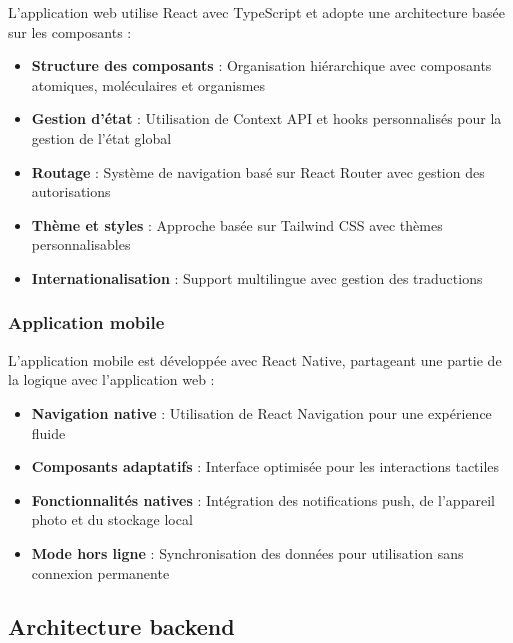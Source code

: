 L'application web utilise React avec TypeScript et adopte une architecture basée sur les composants :

\begin{itemize}
  \item \textbf{Structure des composants} : Organisation hiérarchique avec composants atomiques, moléculaires et organismes
  
  \item \textbf{Gestion d'état} : Utilisation de Context API et hooks personnalisés pour la gestion de l'état global
  
  \item \textbf{Routage} : Système de navigation basé sur React Router avec gestion des autorisations
  
  \item \textbf{Thème et styles} : Approche basée sur Tailwind CSS avec thèmes personnalisables
  
  \item \textbf{Internationalisation} : Support multilingue avec gestion des traductions
\end{itemize}

\subsubsection{Application mobile}

L'application mobile est développée avec React Native, partageant une partie de la logique avec l'application web :

\begin{itemize}
  \item \textbf{Navigation native} : Utilisation de React Navigation pour une expérience fluide
  
  \item \textbf{Composants adaptatifs} : Interface optimisée pour les interactions tactiles
  
  \item \textbf{Fonctionnalités natives} : Intégration des notifications push, de l'appareil photo et du stockage local
  
  \item \textbf{Mode hors ligne} : Synchronisation des données pour utilisation sans connexion permanente
\end{itemize}

\subsection{Architecture backend}

